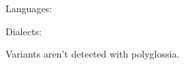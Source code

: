 \documentclass[a4paper]{article}
\begin{document}
Languages:

Dialects: 

Variants aren't detected with polyglossia.
\end{document}
